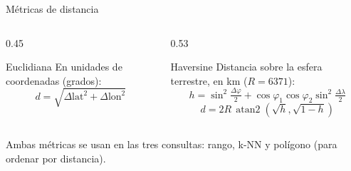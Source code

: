 \documentclass[aspectratio=169,10pt]{beamer}
\begin{document}
\begin{frame}{Métricas de distancia}
  \begin{columns}[T]
    \begin{column}{0.45\textwidth}
      \begin{block}{Euclidiana}
        \small En unidades de coordenadas (grados):
        \[ d = \sqrt{\Delta\text{lat}^2 + \Delta\text{lon}^2} \]
      \end{block}
    \end{column}
    \begin{column}{0.53\textwidth}
      \begin{block}{Haversine}
        \small Distancia sobre la esfera terrestre, en km ($R = 6371$):
        \[ h = \sin^2\!\tfrac{\Delta\varphi}{2} + \cos\varphi_1\cos\varphi_2\sin^2\!\tfrac{\Delta\lambda}{2} \]
        \[ d = 2R\,\operatorname{atan2}\!\left(\sqrt{h},\sqrt{1-h}\right) \]
      \end{block}
    \end{column}
  \end{columns}
  \vspace{0.6em}
  \small Ambas métricas se usan en las tres consultas: rango, k-NN y polígono (para ordenar por distancia).
\end{frame}
\end{document}
